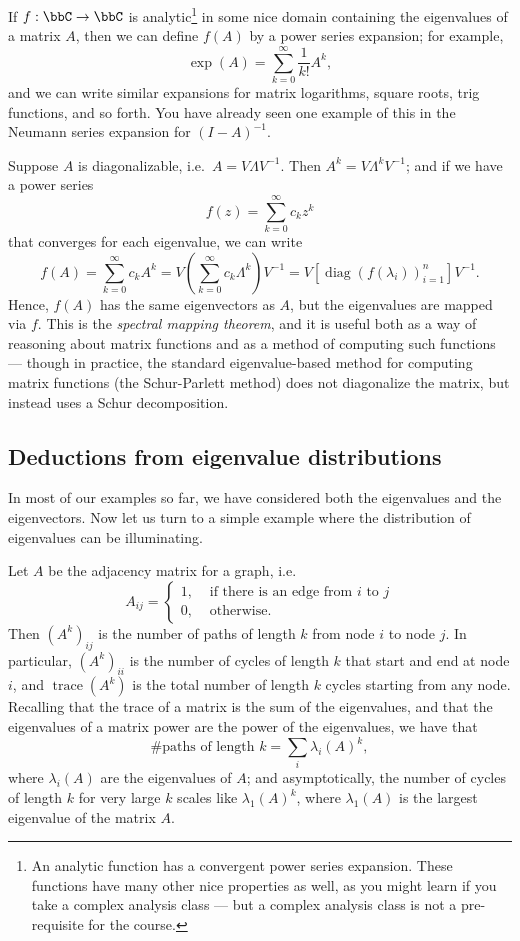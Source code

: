 \documentclass[12pt, leqno]{article} %
\begin{document}
If $f : \bbC \rightarrow \bbC$ is analytic\footnote{%
An analytic function has a convergent power series expansion.  These
functions have many other nice properties as well, as you might learn
if you take a complex analysis class --- but a complex
analysis class is not a pre-requisite for the course.}
in some nice domain containing the eigenvalues of a matrix $A$, then
we can define $f(A)$ by a power series expansion; for example,
\[
  \exp(A) = \sum_{k=0}^\infty \frac{1}{k!} A^k,
\]
and we can write similar expansions for matrix logarithms, square roots,
trig functions, and so forth.  You have already seen one example of this
in the Neumann series expansion for $(I-A)^{-1}$.

Suppose $A$ is diagonalizable, i.e.~$A = V \Lambda V^{-1}$.  Then
$A^k = V \Lambda^k V^{-1}$; and if we have a power series
\[
  f(z) = \sum_{k=0}^\infty c_k z^k
\]
that converges for each eigenvalue, we can write
\[
  f(A) = \sum_{k=0}^\infty c_k A^k
       = V \left( \sum_{k=0}^\infty c_k \Lambda^k \right) V^{-1}
       = V \left[ \operatorname{diag}(f(\lambda_i))_{i=1}^n \right] V^{-1}.
\]
Hence, $f(A)$ has the same eigenvectors as $A$, but the eigenvalues
are mapped via $f$.  This is the {\em spectral mapping theorem}, and it
is useful both as a way of reasoning about matrix functions and as a
method of computing such functions --- though in practice, the standard
eigenvalue-based method for computing matrix functions
(the Schur-Parlett method) does not diagonalize the matrix, but instead
uses a Schur decomposition.

\subsection{Deductions from eigenvalue distributions}

In most of our examples so far, we have considered both the
eigenvalues and the eigenvectors.  Now let us turn to a simple example
where the distribution of eigenvalues can be illuminating.

Let $A$ be the adjacency matrix for a graph, i.e.
\[
  A_{ij} = \begin{cases}
    1, & \mbox{ if there is an edge from $i$ to $j$} \\
    0, & \mbox{ otherwise}.
  \end{cases}
\]
Then $(A^k)_{ij}$ is the number of paths of length $k$ from node $i$
to node $j$.  In particular, $(A^k)_{ii}$ is the number of cycles of
length $k$ that start and end at node $i$, and
$\operatorname{trace}(A^k)$ is the total number of length $k$ cycles
starting from any node.  Recalling that the trace of a matrix is the
sum of the eigenvalues, and that the eigenvalues of a matrix power are
the power of the eigenvalues, we have that
\[
  \mbox{\# paths of length $k$} = \sum_{i} \lambda_i(A)^k,
\]
where $\lambda_i(A)$ are the eigenvalues of $A$; and asymptotically,
the number of cycles of length $k$ for very large $k$ scales like
$\lambda_1(A)^k$, where $\lambda_1(A)$ is the largest eigenvalue of
the matrix $A$.
\end{document}
